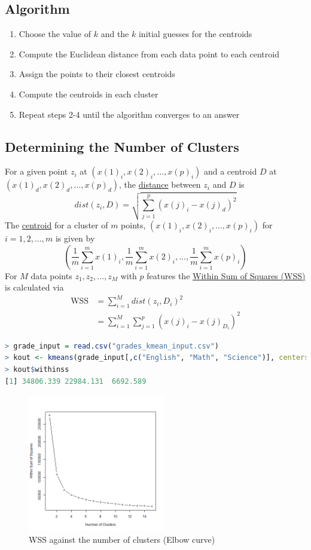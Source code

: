 \documentclass{article}
\begin{document}
\subsection{Algorithm} 
\begin{enumerate}
    \item Choose the value of $k$ and the $k$ initial guesses for the centroids
    \item Compute the Euclidean distance from each data point to each centroid
    \item Assign the points to their closest centroids
    \item Compute the centroids in each cluster
    \item Repeat steps 2-4 until the algorithm converges to an answer
\end{enumerate}

\subsection{Determining the Number of Clusters}
For a given point $z_i$ at $(x(1)_i, x(2)_i, \dots, x(p)_i)$ and a centroid $D$ at $(x(1)_d, x(2)_d, \dots, x(p)_d)$, the \underline{distance} between $z_i$ and $D$ is 
$$dist(z_i, D) = \sqrt{\sum_{j=1}^{p} (x(j)_i - x(j)_d)^2}$$
The \underline{centroid} for a cluster of $m$ points, $(x(1)_i, x(2)_i, \dots, x(p)_i)$ for $i = 1,2,\dots, m$ is given by 
$$\left( \frac{1}{m} \sum_{i=1}^{m}x(1)_i,  \frac{1}{m} \sum_{i=1}^{m}x(2)_i, \dots, \frac{1}{m} \sum_{i=1}^{m}x(p)_i\right)$$
For $M$ data points $z_1, z_2, \dots, z_M$ with $p$ features the \underline{Within Sum of Squares (WSS)} is calculated via
\begin{equation*}
    \begin{split}
        \text{WSS} & = \sum_{i=1}^{M}dist(z_i,D_i)^2\\
        & = \sum_{i=1}^{M} \sum_{j=1}^{p}(x(j)_i - x(j)_{D_i})^2
    \end{split}
\end{equation*}

\begin{lstlisting}[language=R]
> grade_input = read.csv("grades_kmean_input.csv")
> kout <- kmeans(grade_input[,c("English", "Math", "Science")], centers = 3)
> kout$withinss
[1] 34806.339 22984.131  6692.589
\end{lstlisting}

\begin{figure}[H]
    \centering
    \includegraphics[width=6cm]{images/kmeans.png}
    \caption{WSS against the number of clusters (Elbow curve)}
\end{figure}
\end{document}
